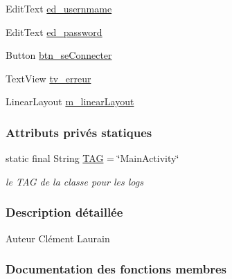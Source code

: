 \begin{DoxyCompactItemize}
Edit\+Text \hyperlink{classfr_1_1campus_1_1laurainc_1_1honeybee_1_1_main_activity_a6735d2eaf34b76f04b3adbb81d0c9718}{ed\+\_\+usernmame}
\item 
Edit\+Text \hyperlink{classfr_1_1campus_1_1laurainc_1_1honeybee_1_1_main_activity_aba0af7add7bf1a55d54043f88deac4ee}{ed\+\_\+password}
\item 
Button \hyperlink{classfr_1_1campus_1_1laurainc_1_1honeybee_1_1_main_activity_a137abde1340a5e7a9b46decff93ad628}{btn\+\_\+se\+Connecter}
\item 
Text\+View \hyperlink{classfr_1_1campus_1_1laurainc_1_1honeybee_1_1_main_activity_ad36da534773710973fd7696ecc23c117}{tv\+\_\+erreur}
\item 
Linear\+Layout \hyperlink{classfr_1_1campus_1_1laurainc_1_1honeybee_1_1_main_activity_ad042c226bc8ec057b85a3f24ae99777f}{m\+\_\+linear\+Layout}
\end{DoxyCompactItemize}
\subsubsection*{Attributs privés statiques}
\begin{DoxyCompactItemize}
\item 
static final String \hyperlink{classfr_1_1campus_1_1laurainc_1_1honeybee_1_1_main_activity_a70b298f4dd3653ab3d15399d84f96fa9}{T\+AG} = \char`\"{}Main\+Activity\char`\"{}
\begin{DoxyCompactList}\small\item\em le T\+AG de la classe pour les logs \end{DoxyCompactList}\end{DoxyCompactItemize}


\subsubsection{Description détaillée}
\begin{DoxyAuthor}{Auteur}
Clément Laurain 
\end{DoxyAuthor}


\subsubsection{Documentation des fonctions membres}
\mbox{\label{classfr_1_1campus_1_1laurainc_1_1honeybee_1_1_main_activity_ae751b46f1881bda6b3b0e08025a9c044}} 
